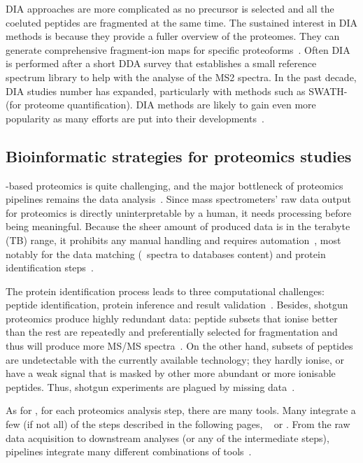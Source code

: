 \gls{DIA} approaches are more complicated
as no precursor is selected and
all the coeluted peptides are fragmented at the same time.
The sustained interest in \gls{DIA} methods is because
they provide a fuller overview of the proteomes.
They can generate comprehensive fragment-ion maps for
specific proteoforms~.
Often \gls{DIA} is performed after a short \gls{DDA} survey
that establishes a small reference spectrum library
to help with the analyse of the MS2 spectra.
In the past decade, \gls{DIA} studies number has expanded,
particularly with methods such as SWATH-\ms~
(for proteome quantification).
\gls{DIA} methods are likely to gain even more popularity
as many efforts are put into their developments~.\mybr\

\subsection{Bioinformatic strategies for proteomics studies}\label{sec:bioinfProt}

\ms-based proteomics is quite challenging,
and the major bottleneck of proteomics pipelines remains
the data analysis~.
Since mass spectrometers' raw data output
for proteomics is directly uninterpretable by a human,
it needs processing before being meaningful.
Because the sheer amount of produced data is in the terabyte (\gls{TB}) range,
it prohibits any manual handling and requires automation~,
most notably for the data matching (\ms\ spectra to databases content) and
protein identification steps~.\mybr\

The protein identification process leads to three computational challenges:
peptide identification, protein inference and result validation~.
Besides, shotgun proteomics produce highly redundant data:
peptide subsets that ionise better than the rest
are repeatedly and preferentially selected for fragmentation
and thus will produce more \gls{MS/MS} spectra~.
On the other hand,
subsets of peptides are undetectable with the currently available technology;
they hardly ionise, or have a weak signal that is masked
by other more abundant or more ionisable peptides.
Thus, shotgun experiments are plagued by missing data~.\mybr\

As for \Rnaseq, for each proteomics analysis step,
there are many tools.
Many integrate a few (if not all) of the steps described in the following pages,
\eg\ 
or .
From the raw data acquisition to downstream analyses
(or any of the intermediate steps),
pipelines integrate many different combinations of tools~.\mybr\

